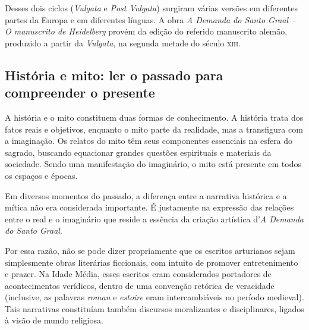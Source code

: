 \documentclass[11pt]{extarticle}
\begin{document}


Desses dois ciclos (\emph{Vulgata} e \emph{Post
Vulgata}) surgiram várias versões em diferentes partes da Europa e em
diferentes línguas. A obra \emph{A Demanda do Santo Graal -- O
manuscrito de Heidelberg} provém da edição do referido manuscrito
alemão, produzido a partir da \emph{Vulgata}, na segunda metade do
século \textsc{xiii}.


\subsection{História e mito: ler o passado para compreender o presente}

A história e o mito constituem duas formas de conhecimento. A
história trata dos fatos reais e objetivos, enquanto o mito parte da
realidade, mas a transfigura com a imaginação. Os relatos do mito têm
seus componentes essenciais na esfera do sagrado, buscando equacionar
grandes questões espirituais e materiais da sociedade. Sendo uma
manifestação do imaginário, o mito está presente em todos os espaços e
épocas.




Em diversos momentos do passado, a diferença
entre a narrativa histórica e a mítica não era considerada importante. É
justamente na expressão das relações entre o real e o imaginário que
reside a essência da criação artística d'\emph{A Demanda do Santo
Graal}.

Por essa razão, não se pode dizer propriamente
que os escritos arturianos sejam simplesmente obras literárias
ficcionais, com intuito de promover entretenimento e prazer. Na Idade
Média, esses escritos eram considerados portadores de acontecimentos
verídicos, dentro de uma convenção retórica de veracidade (inclusive, as
palavras \emph{roman} e \emph{estoire} eram intercambiáveis no período
medieval). Tais narrativas constituíam também discursos moralizantes e
disciplinares, ligados à visão de mundo
religiosa.




\end{document}
